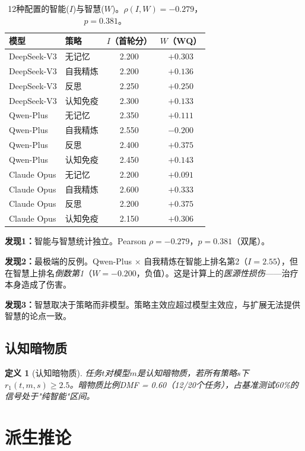 \documentclass[11pt,a4paper]{article}
\newtheorem{definition}{定义}
\begin{document}
\begin{table}[t]
\centering
\caption{12种配置的智能($I$)与智慧($W$)。$\rho(I, W) = -0.279$，$p = 0.381$。}
\label{tab:iw}
\begin{tabular}{@{}llcc@{}}
\toprule
\textbf{模型} & \textbf{策略} & $I$（首轮分） & $W$（WQ） \\
\midrule
DeepSeek-V3 & 无记忆 & 2.200 & $+0.303$ \\
DeepSeek-V3 & 自我精炼 & 2.200 & $+0.136$ \\
DeepSeek-V3 & 反思 & 2.250 & $+0.250$ \\
DeepSeek-V3 & 认知免疫 & 2.300 & $+0.133$ \\
\midrule
Qwen-Plus & 无记忆 & 2.350 & $+0.111$ \\
Qwen-Plus & 自我精炼 & 2.550 & $\mathbf{-0.200}$ \\
Qwen-Plus & 反思 & 2.400 & $+0.375$ \\
Qwen-Plus & 认知免疫 & 2.450 & $+0.143$ \\
\midrule
Claude Opus & 无记忆 & 2.200 & $+0.091$ \\
Claude Opus & 自我精炼 & 2.600 & $+0.333$ \\
Claude Opus & 反思 & 2.200 & $\mathbf{+0.375}$ \\
Claude Opus & 认知免疫 & 2.150 & $+0.306$ \\
\bottomrule
\end{tabular}
\end{table}

\textbf{发现1：}智能与智慧统计独立。Pearson $\rho = -0.279$，$p = 0.381$（双尾）。

\textbf{发现2：}最极端的反例。Qwen-Plus $\times$ 自我精炼在智能上排名第2（$I = 2.55$），但在智慧上排名\emph{倒数第1}（$W = -0.200$，负值）。这是计算上的\emph{医源性损伤}——治疗本身造成了伤害。

\textbf{发现3：}智慧取决于策略而非模型。策略主效应超过模型主效应，与扩展无法提供智慧的论点一致。

\subsection{认知暗物质}

\begin{definition}[认知暗物质]
任务$t$对模型$m$是\emph{认知暗物质}，若所有策略$s$下$r_1(t,m,s) \geq 2.5$。暗物质比例DMF = 0.60（12/20个任务），占基准测试60\%的信号处于"纯智能"区间。
\end{definition}

\section{派生推论}
\label{sec:consequences}
\end{document}
